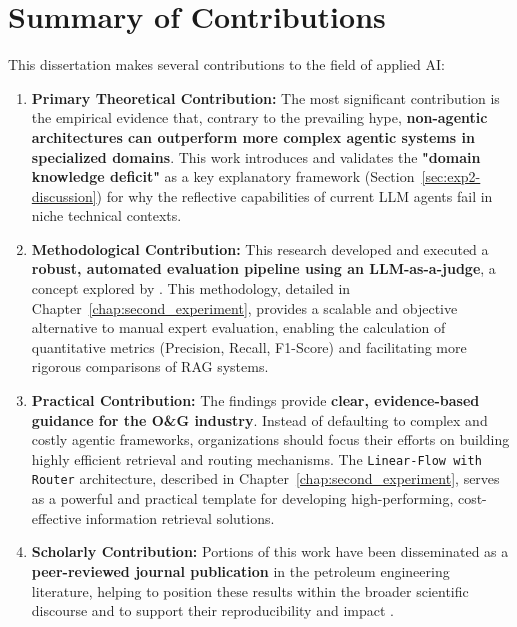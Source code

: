 \section{Summary of Contributions}
\label{sec:conclusion_contributions}

    This dissertation makes several contributions to the field of applied AI:

    \begin{enumerate}
        \item \textbf{Primary Theoretical Contribution:} The most significant contribution is the empirical evidence that, contrary to the prevailing hype, \textbf{non-agentic architectures can outperform more complex agentic systems in specialized domains}. This work introduces and validates the \textbf{"domain knowledge deficit"} as a key explanatory framework (Section~\ref{sec:exp2-discussion}) for why the reflective capabilities of current LLM agents fail in niche technical contexts.

        \item \textbf{Methodological Contribution:} This research developed and executed a \textbf{robust, automated evaluation pipeline using an LLM-as-a-judge}, a concept explored by \citet{Zheng2023}. This methodology, detailed in Chapter~\ref{chap:second_experiment}, provides a scalable and objective alternative to manual expert evaluation, enabling the calculation of quantitative metrics (Precision, Recall, F1-Score) and facilitating more rigorous comparisons of RAG systems.

        \item \textbf{Practical Contribution:} The findings provide \textbf{clear, evidence-based guidance for the O\&G industry}. Instead of defaulting to complex and costly agentic frameworks, organizations should focus their efforts on building highly efficient retrieval and routing mechanisms. The \texttt{Linear-Flow with Router} architecture, described in Chapter~\ref{chap:second_experiment}, serves as a powerful and practical template for developing high-performing, cost-effective information retrieval solutions.

        \item \textbf{Scholarly Contribution:} Portions of this work have been disseminated as a \textbf{peer-reviewed journal publication} in the petroleum engineering literature, helping to position these results within the broader scientific discourse and to support their reproducibility and impact \citep{Sabbagh2024}.
    \end{enumerate}

